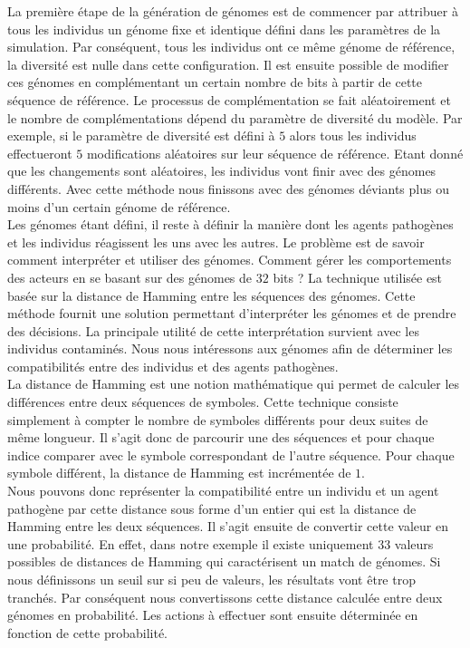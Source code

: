 La première étape de la génération de génomes est de commencer par attribuer à tous les individus un génome fixe et identique défini dans les paramètres de la simulation. Par conséquent, tous les individus ont ce même génome de référence, la diversité est nulle dans cette configuration. Il est ensuite possible de modifier ces génomes en complémentant un certain nombre de bits à partir de cette séquence de référence. Le processus de complémentation se fait aléatoirement et le nombre de complémentations dépend du paramètre de diversité du modèle. Par exemple, si le paramètre de diversité est défini à $5$ alors tous les individus effectueront $5$ modifications aléatoires sur leur séquence de référence. Etant donné que les changements sont aléatoires, les individus vont finir avec des génomes différents. Avec cette méthode nous finissons avec des génomes déviants plus ou moins d'un certain génome de référence.\\

Les génomes étant défini, il reste à définir la manière dont les agents pathogènes et les individus réagissent les uns avec les autres. Le problème est de savoir comment interpréter et utiliser des génomes. Comment gérer les comportements des acteurs en se basant sur des génomes de $32$ bits ? La technique utilisée est basée sur la distance de Hamming entre les séquences des génomes. Cette méthode fournit une solution permettant d'interpréter les génomes et de prendre des décisions. La principale utilité de cette interprétation survient avec les individus contaminés. Nous nous intéressons aux génomes afin de déterminer les compatibilités entre des individus et des agents pathogènes.\\

La distance de Hamming est une notion mathématique qui permet de calculer les différences entre deux séquences de symboles. Cette technique consiste simplement à compter le nombre de symboles différents pour deux suites de même longueur. Il s'agit donc de parcourir une des séquences et pour chaque indice comparer avec le symbole correspondant de l'autre séquence. Pour chaque symbole différent, la distance de Hamming est incrémentée de $1$.\\

Nous pouvons donc représenter la compatibilité entre un individu et un agent pathogène par cette distance sous forme d'un entier qui est la distance de Hamming entre les deux séquences. Il s'agit ensuite de convertir cette valeur en une probabilité. En effet, dans notre exemple il existe uniquement $33$ valeurs possibles de distances de Hamming qui caractérisent un match de génomes. Si nous définissons un seuil sur si peu de valeurs, les résultats vont être trop tranchés. Par conséquent nous convertissons cette distance calculée entre deux génomes en probabilité. Les actions à effectuer sont ensuite déterminée en fonction de cette probabilité.\\

